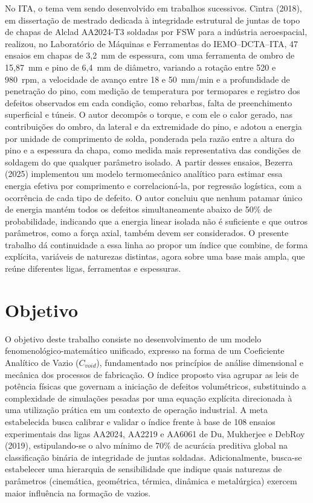 \documentclass[12pt,openany]{report}
\begin{document}
No ITA, o tema vem sendo desenvolvido em trabalhos sucessivos. Cintra (2018), em dissertação de mestrado dedicada à integridade estrutural de juntas de topo de chapas de Alclad AA2024-T3 soldadas por FSW para a indústria aeroespacial, realizou, no Laboratório de Máquinas e Ferramentas do IEMO--DCTA--ITA, 47 ensaios em chapas de 3,2~mm de espessura, com uma ferramenta de ombro de 15,87~mm e pino de 6,4~mm de diâmetro, variando a rotação entre 520 e 980~rpm, a velocidade de avanço entre 18 e 50~mm/min e a profundidade de penetração do pino, com medição de temperatura por termopares e registro dos defeitos observados em cada condição, como rebarbas, falta de preenchimento superficial e túneis. O autor decompôs o torque, e com ele o calor gerado, nas contribuições do ombro, da lateral e da extremidade do pino, e adotou a energia por unidade de comprimento de solda, ponderada pela razão entre a altura do pino e a espessura da chapa, como medida mais representativa das condições de soldagem do que qualquer parâmetro isolado. A partir desses ensaios, Bezerra (2025) implementou um modelo termomecânico analítico para estimar essa energia efetiva por comprimento e correlacioná-la, por regressão logística, com a ocorrência de cada tipo de defeito. O autor concluiu que nenhum patamar único de energia mantém todos os defeitos simultaneamente abaixo de 50\% de probabilidade, indicando que a energia linear isolada não é suficiente e que outros parâmetros, como a força axial, também devem ser considerados. O presente trabalho dá continuidade a essa linha ao propor um índice que combine, de forma explícita, variáveis de naturezas distintas, agora sobre uma base mais ampla, que reúne diferentes ligas, ferramentas e espessuras.

\section{Objetivo}

O objetivo deste trabalho consiste no desenvolvimento de um modelo fenomenológico\hyp{}matemático unificado, expresso na forma de um Coeficiente Analítico de Vazio ($C_{void}$), fundamentado nos princípios de análise dimensional e mecânica dos processos de fabricação. O índice proposto visa agrupar as leis de potência físicas que governam a iniciação de defeitos volumétricos, substituindo a complexidade de simulações pesadas por uma equação explícita direcionada à uma utilização prática em um contexto de operação industrial. A meta estabelecida busca calibrar e validar o índice frente à base de 108 ensaios experimentais das ligas AA2024, AA2219 e AA6061 de Du, Mukherjee e DebRoy (2019), estipulando-se o alvo mínimo de 70\% de acurácia preditiva global na classificação binária de integridade de juntas soldadas. Adicionalmente, busca-se estabelecer uma hierarquia de sensibilidade que indique quais naturezas de parâmetros (cinemática, geométrica, térmica, dinâmica e metalúrgica) exercem maior influência na formação de vazios.
\end{document}
